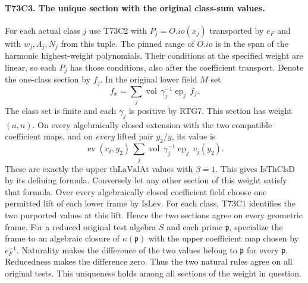 \paragraph{T73C3. The unique section with the original class-sum values.}
For each actual class $j$ use T73C2 with $P_j=O.io(x_j)$ transported
by $e_F$ and with $w_j,\Lambda_j,N_j$ from this tuple. The pinned
range of $O.io$ is in the span of the harmonic highest-weight
polynomials. Their conditions at the specified weight are linear,
so each $P_j$ has those conditions, also after the coefficient
transport. Denote the one-class section by $f_j$. In the original
lower field $M$ set
\[
       f_x=\sum_j \operatorname{vol}\,\gamma_j^{-1}
                         \operatorname{ep}_j\, f_j .
\]
The class set is finite and each $\gamma_j$ is positive by RTG7.
This section has weight $(a,n)$. On every algebraically closed
extension with the two compatible coefficient maps, and on
\emph{every} lifted pair $y_2/y$, its value is
\[
 \operatorname{ev}(c_\delta,y_2)\,
      \sum_j\operatorname{vol}\,\gamma_j^{-1}\operatorname{ep}_j
            \,v_j(y_2).
\]
These are exactly the upper $\mathrm{thLaValAt}$ values with
$\beta=1$. This gives $\mathrm{IsThClsD}$ by its defining
formula. Conversely let any other section of this weight satisfy
that formula. Over every algebraically closed coefficient field
choose one permitted lift of each lower frame by $\mathrm{IsLev}$.
For each class, T73C1 identifies the two purported values at
this lift. Hence the two sections agree on every geometric frame.
For a reduced original test algebra $S$ and each prime
$\mathfrak p$, specialize the frame to an algebraic closure of
$\kappa(\mathfrak p)$ with the upper coefficient map chosen
by $e_F^{-1}$. Naturality makes the difference of the two values
belong to $\mathfrak p$ for every $\mathfrak p$. Reducedness
makes the difference zero. Thus the two natural rules agree
on all original tests. This uniqueness holds among all sections
of the weight in question.

